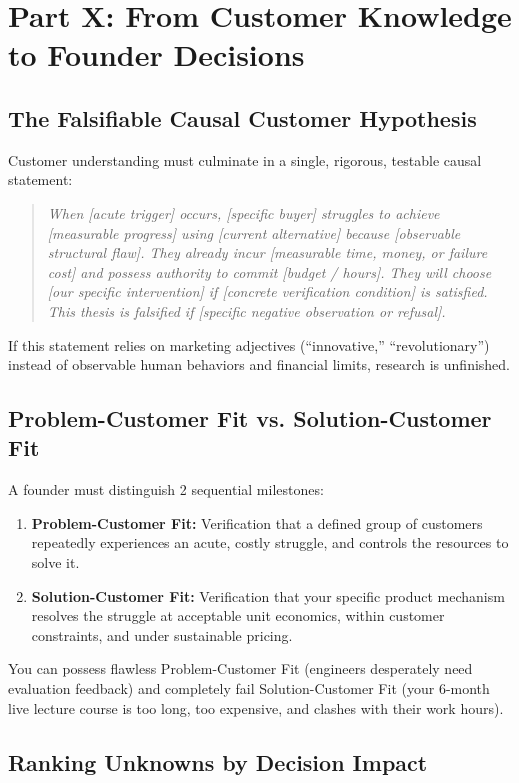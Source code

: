 \section{Part X: From Customer Knowledge to Founder Decisions}

\subsection{The Falsifiable Causal Customer Hypothesis}

Customer understanding must culminate in a single, rigorous, testable causal statement:
\begin{quote}
\small\itshape
When [acute trigger] occurs, [specific buyer] struggles to achieve [measurable progress] using [current alternative] because [observable structural flaw]. They already incur [measurable time, money, or failure cost] and possess authority to commit [budget / hours]. They will choose [our specific intervention] if [concrete verification condition] is satisfied. This thesis is falsified if [specific negative observation or refusal].
\end{quote}
If this statement relies on marketing adjectives (``innovative,'' ``revolutionary'') instead of observable human behaviors and financial limits, research is unfinished.

\subsection{Problem-Customer Fit vs. Solution-Customer Fit}

A founder must distinguish 2 sequential milestones:
\begin{enumerate}[leftmargin=1.2em,itemsep=0.2ex]
  \item \textbf{Problem-Customer Fit:} Verification that a defined group of customers repeatedly experiences an acute, costly struggle, and controls the resources to solve it.
  \item \textbf{Solution-Customer Fit:} Verification that your specific product mechanism resolves the struggle at acceptable unit economics, within customer constraints, and under sustainable pricing.
\end{enumerate}
You can possess flawless Problem-Customer Fit (engineers desperately need evaluation feedback) and completely fail Solution-Customer Fit (your 6-month live lecture course is too long, too expensive, and clashes with their work hours).

\subsection{Ranking Unknowns by Decision Impact}

